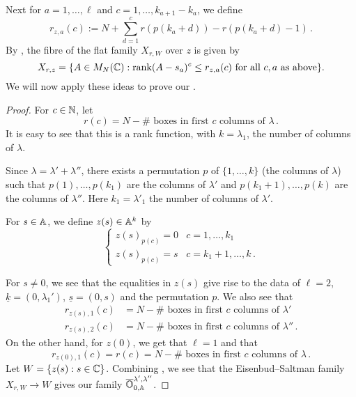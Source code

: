 \documentclass{article}
\begin{document}
Next for $ a = 1, \dots, \ell $ and $ c = 1, \dots, k_{a+1} - k_a$, we define
$$
    r_{z,a}(c):= N + \sum_{d = 1}^c r(p(k_a + d)) - r(p(k_a + d) - 1)  \, . 
$$
By \cite[Corollary 2.2]{eisenbud1989rank}, the fibre of the flat family $ X_{r,W} $ over $ z$ is given by
\begin{equation}\label{eq:ESfibre}
    X_{r,z} = \{ A \in M_N(\CC) :\rk (A-s_a)^c\le r_{z,a}(c) \text{ for all } c , a \text{ as above}\}.
\end{equation}
% 
We will now apply these ideas to prove our .
% 
\begin{proof}
% 
For $ c\in \NN$, let
$$
    r(c) = N - \#\text{~boxes in first $c$ columns of }\lambda\,.
$$
It is easy to see that this is a rank function, with $ k = \lambda_1$, the number of columns of $ \lambda$.

Since $\lambda = \lambda' + \lambda''$, there exists a permutation $ p $ of $ \{1, \dots, k\}$ (the columns of $ \lambda$) such that $ p(1), \dots, p(k_1) $ are the columns of $ \lambda'$ and $ p(k_1+1), \dots, p(k)$ are the columns of $ \lambda''$. Here $ k_1 = \lambda'_1$ the number of columns of $ \lambda'$.

For $ s \in \AA$, we define $ z(s) \in \AA^k$ by 
\[
\begin{cases}
    z(s)_{p(c)} = 0 &  c = 1, \dots, k_1 \\
    z(s)_{p(c)} = s &  c = k_1 + 1, \dots, k\,.
\end{cases}    
\]

For $ s \ne 0$, we see that the equalities in $ z(s) $ give rise to the data of \(\ell = 2\), \(\underline k = (0,\lambda_1')\), \(\underline s = ( 0, s)\) and the permutation $p$.
We also see that
\begin{equation}\label{eq:rcols}
    \begin{split}
            r_{z(s), 1}(c) &=  N - \#\text{~boxes in first $c$ columns of }\lambda' \\
            r_{z(s), 2}(c) &=  N - \#\text{~boxes in first $c$ columns of }\lambda'' \,. 
    \end{split}
\end{equation}
On the other hand, for $z(0)$, we get that $ \ell = 1$ and that 
\begin{equation}\label{eq:rcol2}
    r_{z(0),1}(c) = 
    r(c) = N - \#\text{~boxes in first $c$ columns of }\lambda\,. 
\end{equation}
% 
Let $ W = \{ z(s) : s \in \CC \}$. Combining , we see that the Eisenbud--Saltman family $ X_{r, W} \rightarrow W $ gives our family $ \overline{\OO}^{\lambda', \lambda''}_{0, \AA}$.
\end{proof}
% 
\end{document}
